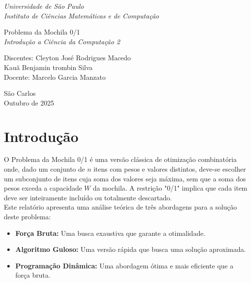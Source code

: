 \documentclass[12pt, a4paper]{article}
\begin{document}
\begin{titlepage}
    \centering


    
    {\large \emph {Universidade de São Paulo}}\\
    {\large \emph {Instituto de Ciências Matemáticas e de Computação}}\\[1cm]
    \vfill 
    
    {\huge {Problema da Mochila 0/1}}\\[1cm]
    {\large \textit{Introdução a Ciência da Computação 2}}\\
    
    \vfill

    \begin{flushright}
        Discentes: Cleyton José Rodrigues Macedo\\
        Kauã Benjamin trombin Silva\\[3mm]
        
        Docente: Marcelo Garcia Manzato\\
    \end{flushright}
    \vfill   
    São Carlos\\
    Outubro de 2025\\

    \pagebreak
    
\end{titlepage}

\section{Introdução}

\indent O Problema da Mochila 0/1 é uma versão clássica de otimização combinatória onde, dado um conjunto de $n$ itens com pesos e valores distintos, deve-se escolher um subconjunto de itens cuja soma dos valores seja máxima, sem que a soma dos pesos exceda a capacidade $W$ da mochila. A restrição "0/1" implica que cada item deve ser inteiramente incluído ou totalmente descartado.\\

\indent Este relatório apresenta uma análise teórica de três abordagens para a solução deste problema:

\begin{itemize}
    \item \textbf{Força Bruta:} Uma busca exaustiva que garante a otimalidade.
    \item \textbf{Algoritmo Guloso:} Uma versão rápida que busca uma solução aproximada.
    \item \textbf{Programação Dinâmica:} Uma abordagem ótima e mais eficiente que a força bruta.
\end{itemize}
\end{document}

